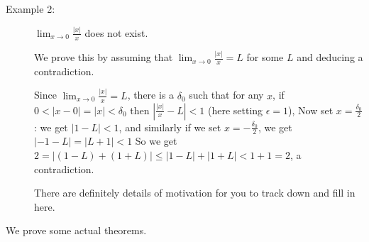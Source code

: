 \documentclass[12pt]{article}
\begin{document}
\begin{description}
\item[Example 2:]  $\lim_{x \rightarrow 0}\frac{|x|}x$  does not exist.

We prove this by assuming that $\lim_{x \rightarrow 0}\frac{|x|}x=L$  for some $L$ and deducing a contradiction.

Since  $\lim_{x \rightarrow 0}\frac{|x|}x=L$, there is a $\delta_0$ such that for any $x$, if $0<|x-0|=|x|<\delta_0$
then $|\frac{|x|}x-L|<1$  (here setting $\epsilon=1$),  Now set $x=\frac{\delta_0}2$:  we get $|1-L|<1$,
and similarly if we set $x=-\frac{\delta_0}2$, we get $|-1-L|=|L+1|< 1$  So we get $2=|(1-L)+(1+L)| \leq |1-L|+|1+L|<1+1=2$, a contradiction.

There are definitely details of motivation for you to track down and fill in here.

\end{description}

We prove some actual theorems.
\end{document}
